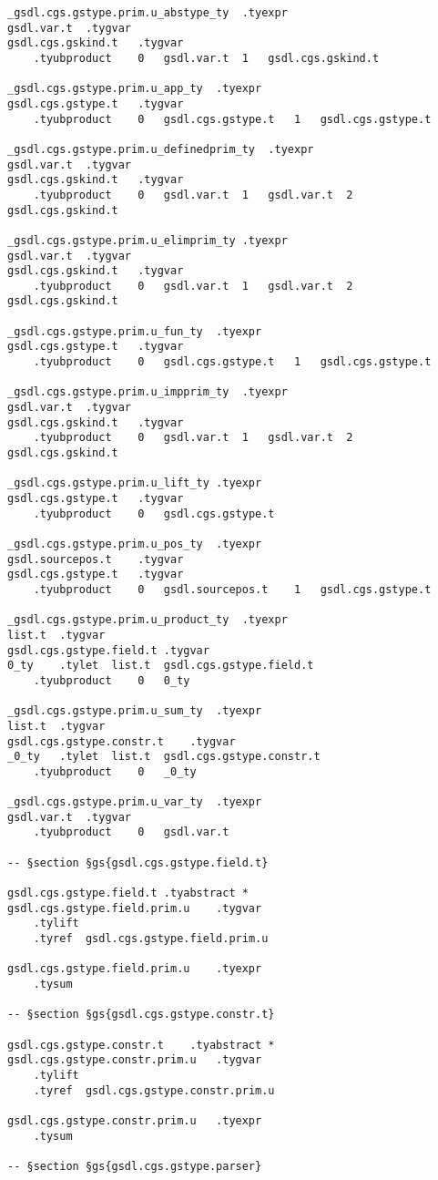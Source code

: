 \documentclass{report}
\begin{document}
\begin{verbatim}
_gsdl.cgs.gstype.prim.u_abstype_ty	.tyexpr
gsdl.var.t	.tygvar
gsdl.cgs.gskind.t	.tygvar
	.tyubproduct	0	gsdl.var.t	1	gsdl.cgs.gskind.t

_gsdl.cgs.gstype.prim.u_app_ty	.tyexpr
gsdl.cgs.gstype.t	.tygvar
	.tyubproduct	0	gsdl.cgs.gstype.t	1	gsdl.cgs.gstype.t

_gsdl.cgs.gstype.prim.u_definedprim_ty	.tyexpr
gsdl.var.t	.tygvar
gsdl.cgs.gskind.t	.tygvar
	.tyubproduct	0	gsdl.var.t	1	gsdl.var.t	2	gsdl.cgs.gskind.t

_gsdl.cgs.gstype.prim.u_elimprim_ty	.tyexpr
gsdl.var.t	.tygvar
gsdl.cgs.gskind.t	.tygvar
	.tyubproduct	0	gsdl.var.t	1	gsdl.var.t	2	gsdl.cgs.gskind.t

_gsdl.cgs.gstype.prim.u_fun_ty	.tyexpr
gsdl.cgs.gstype.t	.tygvar
	.tyubproduct	0	gsdl.cgs.gstype.t	1	gsdl.cgs.gstype.t

_gsdl.cgs.gstype.prim.u_impprim_ty	.tyexpr
gsdl.var.t	.tygvar
gsdl.cgs.gskind.t	.tygvar
	.tyubproduct	0	gsdl.var.t	1	gsdl.var.t	2	gsdl.cgs.gskind.t

_gsdl.cgs.gstype.prim.u_lift_ty	.tyexpr
gsdl.cgs.gstype.t	.tygvar
	.tyubproduct	0	gsdl.cgs.gstype.t

_gsdl.cgs.gstype.prim.u_pos_ty	.tyexpr
gsdl.sourcepos.t	.tygvar
gsdl.cgs.gstype.t	.tygvar
	.tyubproduct	0	gsdl.sourcepos.t	1	gsdl.cgs.gstype.t

_gsdl.cgs.gstype.prim.u_product_ty	.tyexpr
list.t	.tygvar
gsdl.cgs.gstype.field.t	.tygvar
0_ty	.tylet	list.t	gsdl.cgs.gstype.field.t
	.tyubproduct	0	0_ty

_gsdl.cgs.gstype.prim.u_sum_ty	.tyexpr
list.t	.tygvar
gsdl.cgs.gstype.constr.t	.tygvar
_0_ty	.tylet	list.t	gsdl.cgs.gstype.constr.t
	.tyubproduct	0	_0_ty

_gsdl.cgs.gstype.prim.u_var_ty	.tyexpr
gsdl.var.t	.tygvar
	.tyubproduct	0	gsdl.var.t

-- §section §gs{gsdl.cgs.gstype.field.t}

gsdl.cgs.gstype.field.t	.tyabstract	*
gsdl.cgs.gstype.field.prim.u	.tygvar
	.tylift
	.tyref	gsdl.cgs.gstype.field.prim.u

gsdl.cgs.gstype.field.prim.u	.tyexpr
	.tysum

-- §section §gs{gsdl.cgs.gstype.constr.t}

gsdl.cgs.gstype.constr.t	.tyabstract	*
gsdl.cgs.gstype.constr.prim.u	.tygvar
	.tylift
	.tyref	gsdl.cgs.gstype.constr.prim.u

gsdl.cgs.gstype.constr.prim.u	.tyexpr
	.tysum

-- §section §gs{gsdl.cgs.gstype.parser}


\end{verbatim}
\end{document}
